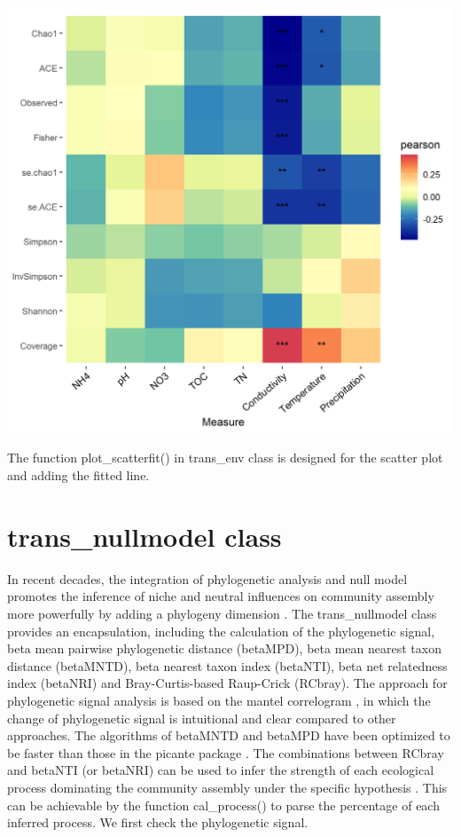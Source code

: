 \documentclass[
]{book}
\begin{document}
\begin{center}\includegraphics[width=600px]{Images/plot_corr_alpha_diversity} \end{center}

The function plot\_scatterfit() in trans\_env class is designed for the scatter plot and adding the fitted line.

\hypertarget{trans_nullmodel-class}{%
\section{trans\_nullmodel class}\label{trans_nullmodel-class}}

In recent decades,
the integration of phylogenetic analysis and null model promotes the inference of niche and neutral influences on community assembly more powerfully
by adding a phylogeny dimension \citep{Webb_Phylogenies_2002, Stegen_Quantifying_2013}.
The trans\_nullmodel class provides an encapsulation, including the calculation of the phylogenetic signal,
beta mean pairwise phylogenetic distance (betaMPD), beta mean nearest taxon distance (betaMNTD),
beta nearest taxon index (betaNTI), beta net relatedness index (betaNRI) and Bray-Curtis-based Raup-Crick (RCbray).
The approach for phylogenetic signal analysis is based on the mantel correlogram \citep{Liu_Long_term_2017},
in which the change of phylogenetic signal is intuitional and clear compared to other approaches.
The algorithms of betaMNTD and betaMPD have been optimized to be faster than those in the picante package \citep{Picante_Kembel_2010}.
The combinations between RCbray and betaNTI (or betaNRI) can be used to infer the strength of each ecological process dominating the community assembly
under the specific hypothesis \citep{Stegen_Quantifying_2013}.
This can be achievable by the function cal\_process() to parse the percentage of each inferred process.
We first check the phylogenetic signal.
\end{document}
